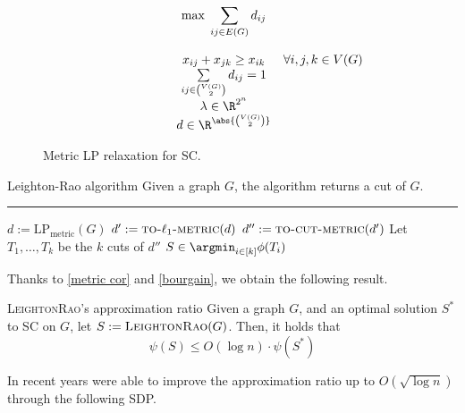 \documentclass[a4paper, 12pt]{report}
\begin{document}
    \begin{figure}[H]
        \centering
        \[\begin{array}{ccl}
            \qquad\qquad\quad
            & \max \; \displaystyle \sum_{ij \in E(G)}{d_{ij}} \\\\
            & x_{ij} + x_{jk} \ge x_{ik} & \forall i, j ,k \in V(G) \\
            & \sum\limits_{ij \in \binom{V(G)}{2}}{d_{ij}} = 1 \\
            & \lambda \in \R^{2^n} \\
            & d \in \R^{\abs{\binom{V(G)}{2}}} \\
        \end{array}\]
        \caption{Metric LP relaxation for SC.}
    \end{figure}

    \begin{framedalgo}{Leighton-Rao algorithm}
        Given a graph $G$, the algorithm returns a cut of $G$. \\
        \hrule

        \quad
        \begin{algorithmic}[1]
                \State $d := \mathrm{LP}_\mathrm{metric}(G)$
                \State $d' := \textsc{to-}\ell_1\textsc{-metric}(d)$ 
                \State $d'' := \textsc{to-cut-metric}(d')$ 
                \State Let $T_1, \ldots, T_k$ be the $k$ cuts of $d''$
                \State {} $\displaystyle S \in \argmin_{i \in [k]}{\phi(T_i)}$
            \EndFunction
        \end{algorithmic}
    \end{framedalgo}
    
    Thanks to \cref{metric cor} and \cref{bourgain}, we obtain the following result.

    \begin{framedthm}{\textsc{LeightonRao}'s approximation ratio}
        Given a graph $G$, and an optimal solution $S^*$ to SC on $G$, let $S := \textsc{LeightonRao}(G)$. Then, it holds that $$\psi(S) \le O(\log n) \cdot \psi(S^*)$$
    \end{framedthm}
    
    In recent years \textcite{arora} were able to improve the approximation ratio up to $O(\sqrt{\log n})$ through the following SDP.
\end{document}
